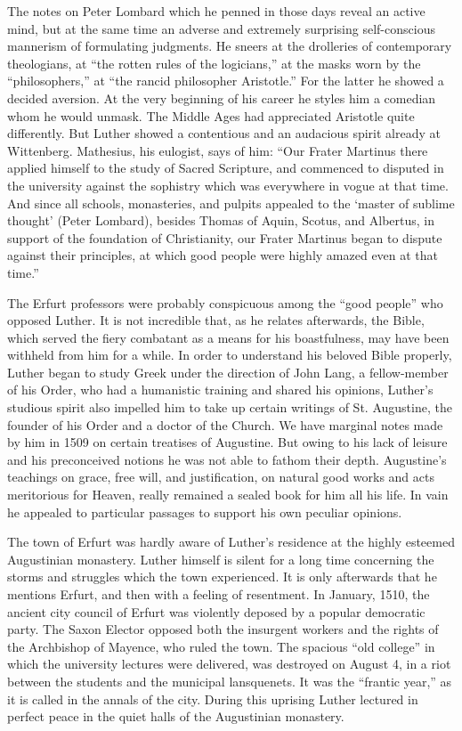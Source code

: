 The notes on Peter Lombard which he penned in those days reveal
an active mind, but at the same time an adverse and extremely surprising
self-conscious mannerism of formulating judgments. He
sneers at the drolleries of contemporary theologians, at “the rotten
rules of the logicians,” at the masks worn by the “philosophers,”
at “the rancid philosopher Aristotle.” For the latter he showed a decided
aversion. At the very beginning of his career he styles him a
comedian whom he would unmask. The Middle Ages had appreciated
Aristotle quite differently. But Luther showed a contentious and an
audacious spirit already at Wittenberg. Mathesius, his eulogist, says
of him: “Our Frater Martinus there applied himself to the study of
Sacred Scripture, and commenced to disputed in the university against
the sophistry which was everywhere in vogue at that time. And since
all schools, monasteries, and pulpits appealed to the ‘master of
sublime thought’ (Peter Lombard), besides Thomas of Aquin, Scotus,
and Albertus, in support of the foundation of Christianity, our
Frater Martinus began to dispute against their principles, at which
good people were highly amazed even at that time.”

The Erfurt professors were probably conspicuous among the “good
people” who opposed Luther. It is not incredible that, as he relates
afterwards, the Bible, which served the fiery combatant as a means
for his boastfulness, may have been withheld from him for a while.
In order to understand his beloved Bible properly, Luther began to
study Greek under the direction of John Lang, a fellow-member
of his Order, who had a humanistic training and shared his opinions,
Luther’s studious spirit also impelled him to take up certain writings
of St. Augustine, the founder of his Order and a doctor of the
Church. We have marginal notes made by him in 1509 on certain
treatises of Augustine. But owing to his lack of leisure and his preconceived
notions he was not able to fathom their depth. Augustine’s
teachings on grace, free will, and justification, on natural good works
and acts meritorious for Heaven, really remained a sealed book for
him all his life. In vain he appealed to particular passages to support
his own peculiar opinions.

The town of Erfurt was hardly aware of Luther’s residence at the
highly esteemed Augustinian monastery. Luther himself is silent for
a long time concerning the storms and struggles which the town
experienced. It is only afterwards that he mentions Erfurt, and then
with a feeling of resentment. In January, 1510, the ancient city
council of Erfurt was violently deposed by a popular democratic
party. The Saxon Elector opposed both the insurgent workers and
the rights of the Archbishop of Mayence, who ruled the town. The
spacious “old college” in which the university lectures were delivered,
was destroyed on August 4, in a riot between the students and the
municipal lansquenets. It was the “frantic year,” as it is called in the
annals of the city. During this uprising Luther lectured in perfect
peace in the quiet halls of the Augustinian monastery.

